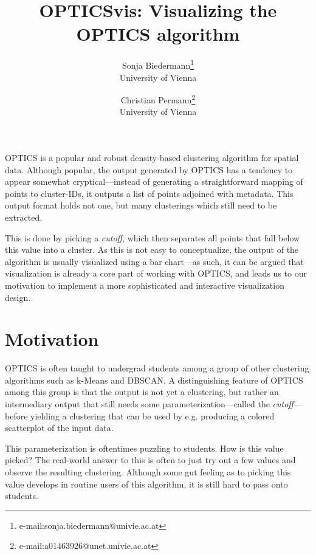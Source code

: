 \documentclass{vgtc} %
\title{OPTICSvis: Visualizing the OPTICS algorithm}
\author{Sonja Biedermann\thanks{e-mail:sonja.biedermann@univie.ac.at }\\ %
\scriptsize University of Vienna %
\and Christian Permann\thanks{e-mail:a01463926@unet.univie.ac.at}\\ %
\scriptsize University of Vienna}
\begin{document}


\maketitle


OPTICS is a popular and robust density-based clustering algorithm for spatial
data. Although popular, the output generated by OPTICS has a tendency to appear
somewhat cryptical---instead of generating a straightforward mapping of points
to cluster-IDs, it outputs a list of points adjoined with metadata. This output
format holds not one, but many clusterings which still need to be extracted.

This is done by picking a \emph{cutoff}, which then separates all points that
fall below this value into a cluster. As this is not easy to conceptualize, the
output of the algorithm is usually visualized using a bar chart---as such, it
can be argued that visualization is already a core part of working with
OPTICS, and leads us to our motivation to implement a more sophisticated and
interactive visualization design.

\section{Motivation} %

OPTICS is often taught to undergrad students among a group of other clustering
algorithms such as k-Means and DBSCAN. A distinguishing feature of OPTICS among
this group is that the output is not yet a clustering, but rather an
intermediary output that still needs some parameterization---called the
\emph{cutoff}---before yielding a clustering that can be used by e.g. producing
a colored scatterplot of the input data.

This parameterization is oftentimes puzzling to students. How is this value
picked? The real-world answer to this is often to just try out a few values and
observe the resulting clustering. Although some gut feeling as to picking this
value develops in routine users of this algorithm, it is still hard to pass
onto students.
\end{document}
